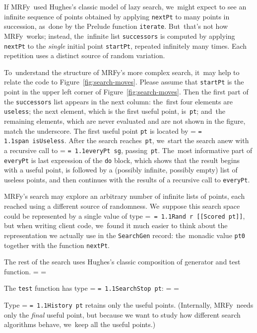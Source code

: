 \documentclass[]{jfp1}
\makeatletter
\newcommand\mrfy{MRFy} %
\newcommand\figref[1]{Figure~\ref{fig:#1}}
\newif\ifverbatimsmall
\newcommand{\mono}[1]{%
  {\@tempdima = \fontdimen2\font
   \texttt{\spaceskip = 1.1\@tempdima #1}}}
\newcommand\smallverbatiminput[1]{%
  \verbatimsmalltrue
  \presvtopsep=\topsep
  \topsep=0.78\topsep
  \verbatimsmallfalse
  \topsep=\presvtopsep
}
\makeatother
\begin{document}
If \mrfy\ used Hughes's classic model of lazy search,
we~might expect to see an infinite sequence of points obtained by
applying \texttt{nextPt} to many points in succession, as~done by
the Prelude function \texttt{iterate}.
But~that's not how \mrfy\ works;
instead, 
the~infinite list \texttt{successors}
is computed by applying \texttt{nextPt} to
the \emph{single} initial point \texttt{startPt}, 
repeated infinitely many times.
Each repetition uses a
distinct source of random variation.

To~understand the structure of
 \mrfy's more complex search, it~may help to
relate the code to \figref{search-moves}.
Please assume that \texttt{startPt} is the point in the upper left
corner of \figref{search-moves}.
Then the first part of the \texttt{successors} list appears in the
next column:
the~first four elements are \texttt{useless};
the next element, which is the first useful point, is~\texttt{pt};
and~the remaining elements, which are never evaluated and are not
shown in the figure,
match the
underscore.
The first useful point \texttt{pt} is located by \mono{span~isUseless}.
After the search reaches~\texttt{pt},
we~start the search anew with a recursive 
call to \mono{everyPt~sg}, 
passing~\texttt{pt}.
%
The~most informative part of \texttt{everyPt} is last expression of
the \texttt{do} block,
which shows that the result begins with a useful point,
is followed by a (possibly infinite, possibly empty) list of useless
points, and then continues with the results of a recursive call
to \texttt{everyPt}. 





\mrfy's search may explore an arbitrary number of infinite
lists of points, each reached using a different source of randomness.
We~suppose this search space could be represented by a single
value of type \mbox{\mono{Rand r [[Scored pt]]}}, but when writing
client code, we~found it much easier to think about the
representation we actually use in the
\texttt{SearchGen} record:
the~monadic value
\texttt{pt0} together with the function \texttt{nextPt}.





The rest of the search uses Hughes's
classic composition of generator  and test function.
\smallverbatiminput{search}
The \texttt{test} function has type \mono{SearchStop~pt}:
\smallverbatiminput{stop}
Type \mono{History~pt} retains only the useful points.
(Internally, \mrfy\ needs only the \emph{final} useful point,
but because we want to study how different search algorithms behave,
we~keep all the useful points.)
\end{document}
